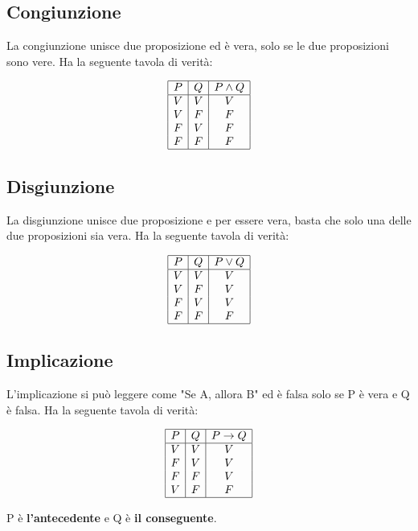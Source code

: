 \documentclass{article}
\begin{document}
\subsection{Congiunzione}

La congiunzione unisce due proposizione ed è vera, solo se le due proposizioni sono vere. Ha la seguente tavola di verità:

\[
\begin{array}{|c|c|c|}
	\hline
	P & Q & P \land Q \\
	\hline
	V & V & V \\
	V & F & F \\
	F & V & F \\
	F & F & F \\
	\hline
\end{array}
\]

\subsection{Disgiunzione}

La disgiunzione unisce due proposizione e per essere vera, basta che solo una delle due proposizioni sia vera. Ha la seguente tavola di verità:

\[
\begin{array}{|c|c|c|}
	\hline
	P & Q & P \lor Q \\
	\hline
	V & V & V \\
	V & F & V \\
	F & V & V \\
	F & F & F \\
	\hline
\end{array}
\]

\subsection{Implicazione}

L'implicazione si può leggere come "Se A, allora B" ed è falsa solo se P è vera e Q è falsa. Ha la seguente tavola di verità:

\[
\begin{array}{|c|c|c|}
	\hline
	P & Q & P \rightarrow Q \\
	\hline
	V & V & V \\
	F & V & V \\
	F & F & V \\
	V & F & F \\
	\hline
\end{array}
\]

P è \textbf{l'antecedente} e Q è \textbf{il conseguente}.
\end{document}
